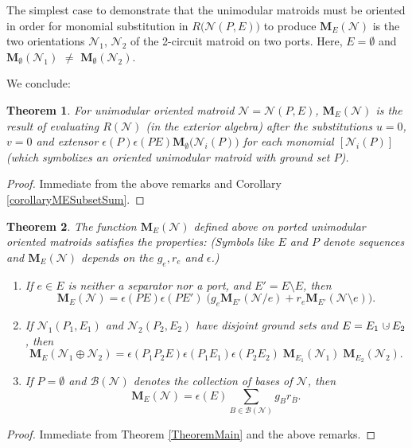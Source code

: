 \documentclass[12pt]{article}
\newtheorem{theorem}{Theorem}[section]
\theoremstyle{definition}
\newcommand{\dunion}
{\mbox{\hbox{\hskip6pt$\cdot$\hskip-5.50pt$\cup$\hskip2pt}}}
\newcommand{\scomp}[1]{\ensuremath{\overline{#1}}}
\newcommand{\ext}[1]{\ensuremath{\mathbf{#1}}}
\begin{document}
The simplest case to demonstrate that the unimodular matroids
must be oriented in order for monomial substitution in
$R\big(\mathcal{N}(P,E)\big)$ to produce $\ext{M}_E(\mathcal{N})$ is
the two orientations $\mathcal{N}_1$, $\mathcal{N}_2$
of the 2-circuit matroid on two ports.  Here, $E=\emptyset$
and $\ext{M}_{\emptyset}(\mathcal{N}_1)$ $\neq$ 
$\ext{M}_{\emptyset}(\mathcal{N}_2)$.

We conclude:

\begin{theorem}
\label{MEofUnimodularExt}
For unimodular oriented matroid
$\mathcal{N}=\mathcal{N}(P,E)$, $\ext{M}_E(\mathcal{N})$ is the result of evaluating 
$R(\mathcal{N})$ (in the exterior algebra) after the substitutions
$u=0$, $v=0$ and extensor 
$\epsilon(P)\epsilon(PE)\ext{M}_\emptyset\big(\mathcal{N}_i(P)\big)$
for each monomial $[\mathcal{N}_i(P)]$ (which symbolizes an oriented 
unimodular matroid with ground set $P$).
\end{theorem}
\begin{proof}
Immediate from the above remarks and Corollary \ref{corollaryMESubsetSum}.
\end{proof}

\begin{theorem}
\label{EquationsExtFunMatroids}
The function $\ext{M}_E(\mathcal{N})$ defined above 
on ported unimodular oriented matroids satisfies the 
properties:  (Symbols like $E$ and $P$ 
denote sequences and $\ext{M}_E(\mathcal{N})$ 
depends on the $g_e, r_e$ and $\epsilon$.)
\begin{enumerate}
\item If $e\in E$ is neither a separator nor a port, and $E'=E\setminus E$,  
then
\[
\ext{M}_E(\mathcal{N})=\epsilon(PE)\epsilon(PE')\;
\big(g_e\ext{M}_{E'}(\mathcal{N}/e) + r_e \ext{M}_{E'}(\mathcal{N}\setminus e)\big).
\]
\item If 
$\mathcal{N}_1(P_1,E_1)$ and $\mathcal{N}_2(P_2,E_2)$ have 
disjoint ground sets and $E=E_1\dunion E_2$, then
\[
\ext{M}_E(\mathcal{N}_1\oplus\mathcal{N}_2)=
\epsilon(P_1P_2E)\epsilon(P_1E_1)\epsilon(P_2E_2)\;
\ext{M}_{E_1}(\mathcal{N}_1)\;\ext{M}_{E_2}(\mathcal{N}_2).
\]
\item If $P=\emptyset$ and  
$\mathcal{B}(\mathcal{N})$ denotes the collection of bases of 
$\mathcal{N}$, then
\[
\ext{M}_E(\mathcal{N})=\epsilon(E)\sum_{B\in\mathcal{B}(\mathcal{N})}g_Br_{\scomp{B}}.
\]

\end{enumerate}
\end{theorem}
\begin{proof}
Immediate from Theorem \ref{TheoremMain} and the above
remarks.
\end{proof}
\end{document}
